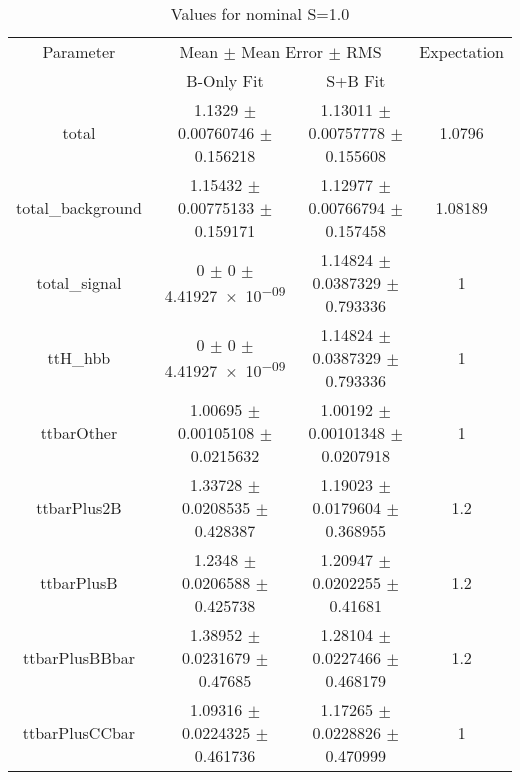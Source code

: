 \begin{table}
\centering
\caption{Values for nominal S=1.0}
\begin{tabular}{cccc}
\toprule
Parameter & \multicolumn{2}{c}{Mean $\pm$ Mean Error $\pm$ RMS} & Expectation\\
 & B-Only Fit & S+B Fit & \\
\midrule
total & \num{1.1329} $\pm$ \num{0.00760746} $\pm$ \num{0.156218} & \num{1.13011} $\pm$ \num{0.00757778} $\pm$ \num{0.155608} & \num{1.0796}\\
total\_background & \num{1.15432} $\pm$ \num{0.00775133} $\pm$ \num{0.159171} & \num{1.12977} $\pm$ \num{0.00766794} $\pm$ \num{0.157458} & \num{1.08189}\\
total\_signal & \num{0} $\pm$ \num{0} $\pm$ \num{4.41927e-09} & \num{1.14824} $\pm$ \num{0.0387329} $\pm$ \num{0.793336} & \num{1}\\
ttH\_hbb & \num{0} $\pm$ \num{0} $\pm$ \num{4.41927e-09} & \num{1.14824} $\pm$ \num{0.0387329} $\pm$ \num{0.793336} & \num{1}\\
ttbarOther & \num{1.00695} $\pm$ \num{0.00105108} $\pm$ \num{0.0215632} & \num{1.00192} $\pm$ \num{0.00101348} $\pm$ \num{0.0207918} & \num{1}\\
ttbarPlus2B & \num{1.33728} $\pm$ \num{0.0208535} $\pm$ \num{0.428387} & \num{1.19023} $\pm$ \num{0.0179604} $\pm$ \num{0.368955} & \num{1.2}\\
ttbarPlusB & \num{1.2348} $\pm$ \num{0.0206588} $\pm$ \num{0.425738} & \num{1.20947} $\pm$ \num{0.0202255} $\pm$ \num{0.41681} & \num{1.2}\\
ttbarPlusBBbar & \num{1.38952} $\pm$ \num{0.0231679} $\pm$ \num{0.47685} & \num{1.28104} $\pm$ \num{0.0227466} $\pm$ \num{0.468179} & \num{1.2}\\
ttbarPlusCCbar & \num{1.09316} $\pm$ \num{0.0224325} $\pm$ \num{0.461736} & \num{1.17265} $\pm$ \num{0.0228826} $\pm$ \num{0.470999} & \num{1}\\
\bottomrule
\end{tabular}
\end{table}